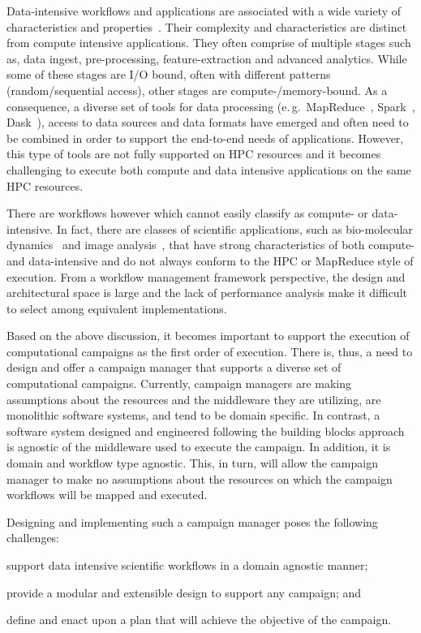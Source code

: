 Data-intensive workflows and applications are associated with a wide variety of characteristics and properties~\cite{fox2014towards,fox2014big}.
Their complexity and characteristics are distinct from compute intensive applications.
They often comprise of multiple stages such as, data ingest, pre-processing, feature-extraction and advanced analytics.
While some of these stages are I/O bound, often with different patterns (random/sequential access), other stages are compute-/memory-bound.
As a consequence, a diverse set of tools for data processing (e.\,g.\ MapReduce~\cite{dean2004mapreduce}, Spark~\cite{zaharia2010spark}, Dask~\cite{rocklin2015dask}), access to data sources and data formats have emerged and often need to be combined in order to support the end-to-end needs of applications.
However, this type of tools are not fully supported on HPC resources and it becomes challenging to execute both compute and data intensive applications on the same HPC resources.

There are workflows however which cannot easily classify as compute- or data-intensive.
In fact, there are classes of scientific applications, such as bio-molecular dynamics~\cite{dror2012biomolecular} and image analysis~\cite{goncalves2020sealnet}, that have strong characteristics of both compute- and data-intensive and do not always conform to the HPC or MapReduce style of execution.
From a workflow management framework perspective, the design and architectural space is large and the lack of performance analysis make it difficult to select among equivalent implementations.

Based on the above discussion, it becomes important to support the execution of computational campaigns as the first order of execution.
There is, thus, a need to design and offer a campaign manager that supports a diverse set of computational campaigns.
Currently, campaign managers are making assumptions about the resources and the middleware they are utilizing, are monolithic software systems, and tend to be domain specific.
In contrast, a software system designed and engineered following the building blocks approach~\cite{turilli2019middleware} is agnostic of the middleware used to execute the campaign.
In addition, it is domain and workflow type agnostic.
This, in turn, will allow the campaign manager to make no assumptions about the resources on which the campaign workflows will be mapped and executed.

Designing and implementing such a campaign manager poses the following challenges:
\begin{inparaenum}[1)]
    \item support data intensive scientific workflows in a domain agnostic manner;
    \item provide a modular and extensible design to support any campaign; and
    \item define and enact upon a plan that will achieve the objective of the campaign.
\end{inparaenum}


